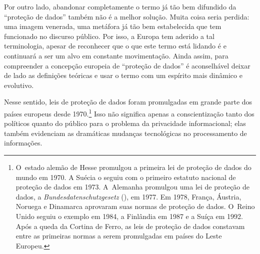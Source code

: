 Por outro lado, abandonar completamente o termo já tão bem difundido da
``proteção de dados'' também não é a melhor solução. Muita coisa seria
perdida: uma imagem venerada, uma metáfora já tão bem estabelecida que
tem funcionado no discurso público. Por isso, a Europa tem aderido a tal
terminologia, apesar de reconhecer que o que este termo está lidando é e
continuará a ser um alvo em constante movimentação. Ainda assim, para
compreender a concepção europeia de ``proteção de dados'' é aconselhável
deixar de lado as definições teóricas e usar o termo com um espírito
mais dinâmico e evolutivo.

Nesse sentido, leis de proteção de dados foram promulgadas em grande
parte dos países europeus desde 1970.\footnote{O~estado alemão de Hesse
  promulgou a primeira lei de proteção de dados do mundo em 1970. A
  Suécia o seguiu com o primeiro estatuto nacional de proteção de dados
  em 1973. A~Alemanha promulgou uma lei de proteção de dados, a
  \emph{Bundesdatenschutzgesetz} (), em 1977. Em 1978, França,
  Áustria, Noruega e Dinamarca aprovaram suas normas de proteção de
  dados. O~Reino Unido seguiu o exemplo em 1984, a Finlândia em 1987 e a
  Suíça em 1992. Após a queda da Cortina de Ferro, as leis de proteção
  de dados constavam entre as primeiras normas a serem promulgadas em
  países do Leste Europeu.} Isso não significa apenas a conscientização
tanto dos políticos quanto do público para o problema da privacidade
informacional; elas também evidenciam as dramáticas mudanças
tecnológicas no processamento de informações.

